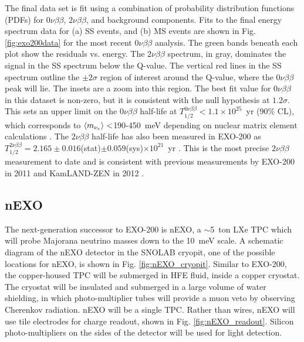 The final data set is fit using a combination of probability distribution functions (PDFs) for $0\nu\beta\beta$, $2\nu\beta\beta$, and background components.  Fits to the final energy spectrum data for (a) SS events, and (b) MS events are shown in Fig. \ref{fig:exo200data} for the most recent $0\nu\beta\beta$ analysis.  The green bands beneath each plot show the residuals vs. energy.  The $2\nu\beta\beta$ spectrum, in gray, dominates the signal in the SS spectrum below the Q-value.  The vertical red lines in the SS spectrum outline the $\pm 2 \sigma$ region of interest around the Q-value, where the $0\nu\beta\beta$ peak will lie.  The insets are a zoom into this region.  The best fit value for $0\nu\beta\beta$ in this dataset is non-zero, but it is consistent with the null hypothesis at $1.2 \sigma$.  This sets an upper limit on the $0\nu\beta\beta$ half-life at $T^{0\nu\beta\beta}_{1/2} < 1.1 \times 10^{25}$~yr (90\% CL), which corresponds to $\braket{m_{\nu_{e}}} < $190-450~meV depending on nuclear matrix element calculations \cite{EXO2000nuNature}.  The $2\nu\beta\beta$ half-life has also been measured in EXO-200 as $T^{2\nu\beta\beta}_{1/2} = 2.165 \pm 0.016$(stat)$ \pm 0.059$(sys)$ \times 10^{21}$~yr \cite{EXO200TwoNuLong}.  This is the most precise $2\nu\beta\beta$ measurement to date and is consistent with previous measurements by EXO-200 in 2011 \cite{EXO200TwoNuOriginal} and KamLAND-ZEN in 2012 \cite{KamLAND}.

\subsection{nEXO}

The next-generation successor to EXO-200 is nEXO, a $\sim$5~ton LXe TPC which will probe Majorana neutrino masses down to the 10~meV scale.  A schematic diagram of the nEXO detector in the SNOLAB cryopit, one of the possible locations for nEXO, is shown in Fig. \ref{fig:nEXO_cryopit}.  Similar to EXO-200, the copper-housed TPC will be submerged in HFE fluid, inside a copper cryostat.  The cryostat will be insulated and submerged in a large volume of water shielding, in which photo-multiplier tubes will provide a muon veto by observing Cherenkov radiation.  nEXO will be a single TPC.  Rather than wires, nEXO will use tile electrodes for charge readout, shown in Fig. \ref{fig:nEXO_readout}.  Silicon photo-multipliers on the sides of the detector will be used for light detection.

